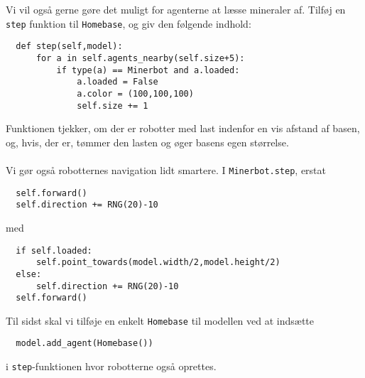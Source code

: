 \documentclass[12pt]{article}
\begin{document}
Vi vil også gerne gøre det muligt for agenterne at læsse mineraler af. Tilføj en \texttt{step} funktion til \texttt{Homebase}, og giv den følgende indhold:
\begin{lstlisting}
  def step(self,model):
      for a in self.agents_nearby(self.size+5):
          if type(a) == Minerbot and a.loaded:
              a.loaded = False
              a.color = (100,100,100)
              self.size += 1
\end{lstlisting}
Funktionen tjekker, om der er robotter med last indenfor en vis afstand af basen, og, hvis, der er, tømmer den lasten og øger basens egen størrelse.\\\\
Vi gør også robotternes navigation lidt smartere. I \texttt{Minerbot.step}, erstat
\begin{lstlisting}
  self.forward()
  self.direction += RNG(20)-10
\end{lstlisting}
med
\begin{lstlisting}
  if self.loaded:
      self.point_towards(model.width/2,model.height/2)
  else:
      self.direction += RNG(20)-10
  self.forward()
\end{lstlisting}
Til sidst skal vi tilføje en enkelt \texttt{Homebase} til modellen ved at indsætte
\begin{lstlisting}
  model.add_agent(Homebase())
\end{lstlisting}
i \texttt{step}-funktionen hvor robotterne også oprettes.
\end{document}
